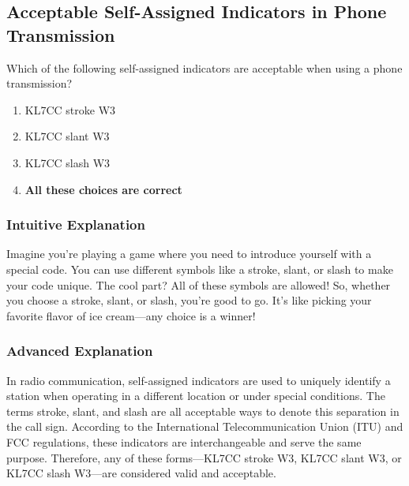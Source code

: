 \subsection{Acceptable Self-Assigned Indicators in Phone Transmission}\label{T1F06}

\begin{tcolorbox}[colback=gray!10!white,colframe=black!75!black,title=T1F06]
Which of the following self-assigned indicators are acceptable when using a phone transmission?
\begin{enumerate}[label=\Alph*)]
    \item KL7CC stroke W3
    \item KL7CC slant W3
    \item KL7CC slash W3
    \item \textbf{All these choices are correct}
\end{enumerate}
\end{tcolorbox}

\subsubsection{Intuitive Explanation}
Imagine you're playing a game where you need to introduce yourself with a special code. You can use different symbols like a stroke, slant, or slash to make your code unique. The cool part? All of these symbols are allowed! So, whether you choose a stroke, slant, or slash, you're good to go. It's like picking your favorite flavor of ice cream—any choice is a winner!

\subsubsection{Advanced Explanation}
In radio communication, self-assigned indicators are used to uniquely identify a station when operating in a different location or under special conditions. The terms stroke, slant, and slash are all acceptable ways to denote this separation in the call sign. According to the International Telecommunication Union (ITU) and FCC regulations, these indicators are interchangeable and serve the same purpose. Therefore, any of these forms—KL7CC stroke W3, KL7CC slant W3, or KL7CC slash W3—are considered valid and acceptable.


